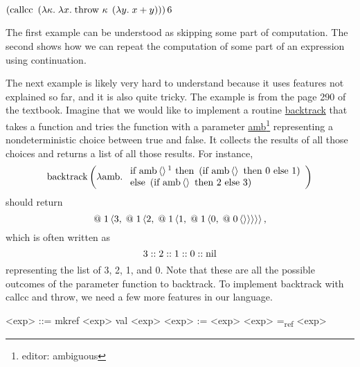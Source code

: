 \begin{enumcirc}
\begin{enumrm}
		\item
		$\left( \textrm{callcc } \left( \lambda \kappa .\; \lambda x .\; \textrm{throw } \kappa \; \left( \lambda y .\; x + y \right) \right) \right) 6$
	\end{enumrm}
	The first example can be understood as skipping some part of computation.
	The second shows how we can repeat the computation of some part of an
	expression using continuation.
	\item
	The next example is likely very hard to understand because it uses features not
	explained so far, and it is also quite tricky.
	The example is from the page 290 of the textbook.
	Imagine that we would like to implement a routine \ul{backtrack} that takes a
	function and tries the function with a parameter \ul{amb}\footnote{editor:
		ambiguous} representing a nondeterministic choice between true and false.
	It collects the results of all those choices and returns a list of all those
	results.
	For instance,
	\[
		\textrm{backtrack} \prths{
			\lambda \textrm{amb} . \;
			\begin{array}{l}
				\textrm{if } \textrm{amb}\chevrons{}\footnotemark \textrm{ then } \prths{
					\textrm{if } \textrm{amb}\chevrons{} \textrm{ then } 0 \textrm{ else } 1
				} \\
				\textrm{else } \prths{
					\textrm{if } \textrm{amb}\chevrons{} \textrm{ then } 2 \textrm{ else } 3
				}
			\end{array}
		}
	\]
	should return
	\[
		@ \; 1 \left\langle 
			3, \;
			@ \; 1 \left\langle 
				2, \;
				@ \; 1 \left\langle 
					1, \;
					@ \; 1 \left\langle 
						0, \;
						@ \; 0 \left\langle  \right\rangle
					 \right\rangle
				 \right\rangle
			 \right\rangle
		 \right\rangle,
	\]
	which is often written as
	\[
		3 :: 2 :: 1 :: 0 :: \textrm{nil}
	\]
	representing the list of 3, 2, 1, and 0.
	Note that these are all the possible outcomes of the parameter function to
	backtrack.
	To implement backtrack with callcc and throw, we need a few more features in
	our language.
	\begin{center}
		\begin{minipage}{0.8\textwidth}
			\grammarindent=1.5cm
			\begin{grammar}
				<exp> ::= mkref <exp> \footnotemark
				\alt val <exp> \footnotemark
				\alt <exp> := <exp> \footnotemark
				\alt <exp> =\textsubscript{ref} <exp> \footnotemark
			\end{grammar}
		\end{minipage}
	\end{center}


\end{enumcirc}
